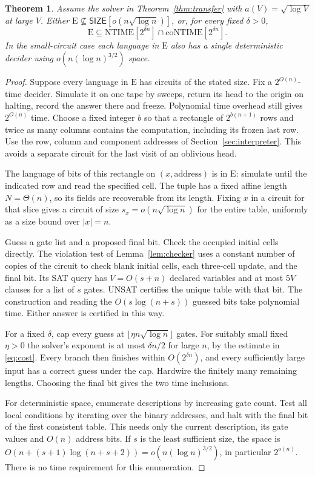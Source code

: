 \documentclass[12pt,letterpaper]{article}
\newtheorem{theorem}{Theorem}
\begin{document}
\begin{theorem}\label{thm:winwin}
Assume the solver in Theorem~\ref{thm:transfer} with
$a(V)=\sqrt{\log V}$ at large $V$. Either
$\mathrm E\not\subseteq\mathsf{SIZE}[o(n\sqrt{\log n})]$, or, for
every fixed $\delta>0$,
\[
 \mathrm E\subseteq\mathrm{NTIME}[2^{\delta n}]
             \cap\mathrm{coNTIME}[2^{\delta n}].
\]
In the small-circuit case each language in $\mathrm E$ also has a
single deterministic decider using $o(n(\log n)^{3/2})$ space.
\end{theorem}
\begin{proof}
Suppose every language in $\mathrm E$ has circuits of the stated size.
Fix a $2^{O(n)}$-time decider. Simulate it on one tape by sweeps,
return its head to the origin on halting, record the answer there and
freeze. Polynomial time overhead still gives $2^{O(n)}$ time. Choose
a fixed integer $b$ so that a rectangle of $2^{b(n+1)}$ rows and
twice as many columns contains the computation, including its frozen
last row. Use the row, column and component addresses of
Section~\ref{sec:interpreter}. This avoids a separate circuit for the
last visit of an oblivious head.

The language of bits of this rectangle on $(x,\text{address})$ is in
$\mathrm E$: simulate until the indicated row and read the specified
cell. The tuple has a fixed affine length $N=\Theta(n)$, so its fields
are recoverable from its length. Fixing $x$ in a circuit for that
slice gives a circuit of size $s_x=o(n\sqrt{\log n})$ for the entire
table, uniformly as a size bound over $|x|=n$.

Guess a gate list and a proposed final bit. Check the occupied initial
cells directly. The violation test of Lemma~\ref{lem:checker} uses a
constant number of copies of the circuit to check blank initial cells,
each three-cell update, and the final bit. Its SAT query has
$V=O(s+n)$ declared variables and at most $5V$ clauses for a list
of $s$ gates. UNSAT certifies the unique table with that bit. The
construction and reading the $O(s\log(n+s))$ guessed bits take
polynomial time. Either answer is certified in this way.

For a fixed $\delta$, cap every guess at
$\lfloor\eta n\sqrt{\log n}\rfloor$ gates. For suitably small fixed
$\eta>0$ the solver's exponent is at most $\delta n/2$ for large
$n$, by the estimate in \eqref{eq:cost}. Every branch then finishes
within $O(2^{\delta n})$, and every sufficiently large input has a
correct guess under the cap. Hardwire the finitely many remaining
lengths. Choosing the final bit gives the two time inclusions.

For deterministic space, enumerate descriptions by increasing gate
count. Test all local conditions by iterating over the binary
addresses, and halt with the final bit of the first consistent table.
This needs only the current description, its gate values and $O(n)$
address bits. If $s$ is the least sufficient size, the space is
$O(n+(s+1)\log(n+s+2))=o(n(\log n)^{3/2})$, in particular
$2^{o(n)}$. There is no time requirement for this enumeration.
\end{proof}
\end{document}

